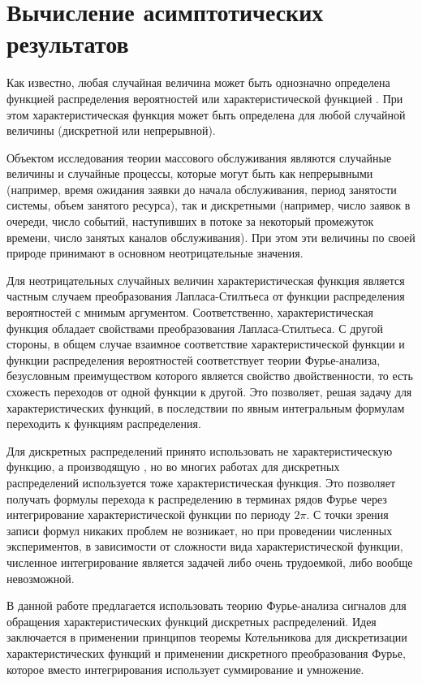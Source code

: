 \section {Вычисление асимптотических результатов}
Как известно, любая случайная величина может быть однозначно определена функцией распределения вероятностей или характеристической функцией \cite{gnedenko2010}. При этом характеристическая функция может быть определена для любой случайной величины (дискретной или непрерывной).

Объектом исследования теории массового обслуживания являются случайные величины и случайные процессы, которые могут быть как непрерывными (например, время ожидания заявки до начала обслуживания, период занятости системы, объем занятого ресурса), так и дискретными (например, число заявок в очереди, число событий, наступивших в потоке за некоторый промежуток времени, число занятых каналов обслуживания). При этом эти величины по своей природе принимают в основном неотрицательные значения.

Для неотрицательных случайных величин характеристическая функция является частным случаем преобразования Лапласа-Стилтьеса от функции распределения вероятностей с мнимым аргументом. Соответственно, характеристическая функция обладает свойствами преобразования Лапласа-Стилтьеса. С другой стороны, в общем случае взаимное соответствие характеристической функции и функции распределения вероятностей соответствует теории Фурье-анализа, безусловным преимуществом которого является свойство двойственности, то есть схожесть переходов от одной функции к другой. Это позволяет, решая задачу для характеристических функций, в последствии по явным интегральным формулам переходить к функциям распределения.

Для дискретных распределений принято использовать не характеристическую функцию, а производящую \cite{kalinina2016}, но во многих работах для дискретных распределений используется тоже характеристическая функция. Это позволяет получать формулы перехода к распределению в терминах рядов Фурье через интегрирование характеристической функции по периоду $2\pi$. С точки зрения записи формул никаких проблем не возникает, но при проведении численных экспериментов, в зависимости от сложности вида характеристической функции, численное интегрирование является задачей либо очень трудоемкой, либо вообще невозможной.

В данной работе предлагается использовать теорию Фурье-анализа сигналов для обращения характеристических функций дискретных распределений. Идея заключается в применении принципов теоремы Котельникова \cite{ястребов2012дискретизация,kuznecov2008} для дискретизации характеристических функций и применении дискретного преобразования Фурье, которое вместо интегрирования использует суммирование и умножение.
